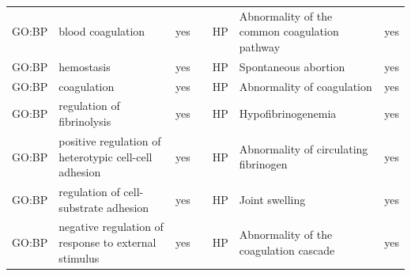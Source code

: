 \begin{longtable}{@{}lp{4cm}lllp{4cm}l@{}}
GO:BP           & blood coagulation                                                                                                                  & yes              &           & HP              & Abnormality of the common coagulation pathway                                                                                                                          & yes              \\
GO:BP           & hemostasis                                                                                                                         & yes              &           & HP              & Spontaneous abortion                                                                                                                                                   & yes              \\
GO:BP           & coagulation                                                                                                                        & yes              &           & HP              & Abnormality of coagulation                                                                                                                                             & yes              \\
GO:BP           & regulation of fibrinolysis                                                                                                         & yes              &           & HP              & Hypofibrinogenemia                                                                                                                                                     & yes              \\
GO:BP           & positive regulation of heterotypic cell-cell adhesion                                                                              & yes              &           & HP              & Abnormality of circulating fibrinogen                                                                                                                                  & yes              \\
GO:BP           & regulation of cell-substrate adhesion                                                                                              & yes              &           & HP              & Joint swelling                                                                                                                                                         & yes              \\
GO:BP           & negative regulation of response to external stimulus                                                                               & yes              &           & HP              & Abnormality of the coagulation cascade                                                                                                                                 & yes              \\

\end{longtable}
